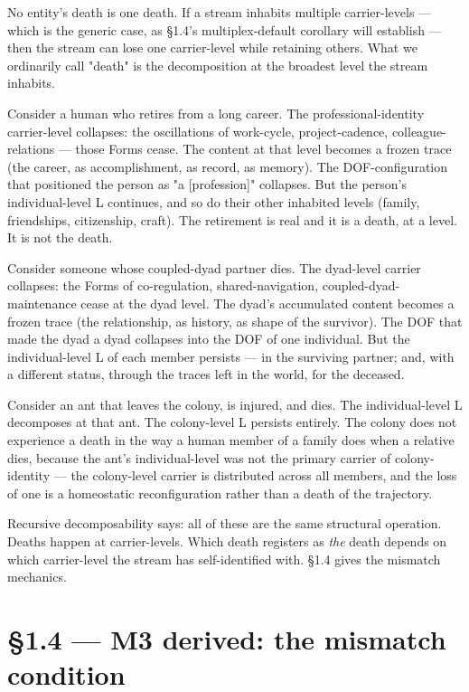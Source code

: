 \documentclass[11pt, openany]{book}
\newcommand{\sectionbreak}{\clearpage}
\begin{document}
No entity's death is one death. If a stream inhabits multiple carrier-levels --- which is the generic case, as §1.4's multiplex-default corollary will establish --- then the stream can lose one carrier-level while retaining others. What we ordinarily call "death" is the decomposition at the broadest level the stream inhabits.

Consider a human who retires from a long career. The professional-identity carrier-level collapses: the oscillations of work-cycle, project-cadence, colleague-relations --- those Forms cease. The content at that level becomes a frozen trace (the career, as accomplishment, as record, as memory). The DOF-configuration that positioned the person as "a [profession]" collapses. But the person's individual-level L continues, and so do their other inhabited levels (family, friendships, citizenship, craft). The retirement is real and it is a death, at a level. It is not the death.

Consider someone whose coupled-dyad partner dies. The dyad-level carrier collapses: the Forms of co-regulation, shared-navigation, coupled-dyad-maintenance cease at the dyad level. The dyad's accumulated content becomes a frozen trace (the relationship, as history, as shape of the survivor). The DOF that made the dyad a dyad collapses into the DOF of one individual. But the individual-level L of each member persists --- in the surviving partner; and, with a different status, through the traces left in the world, for the deceased.

Consider an ant that leaves the colony, is injured, and dies. The individual-level L decomposes at that ant. The colony-level L persists entirely. The colony does not experience a death in the way a human member of a family does when a relative dies, because the ant's individual-level was not the primary carrier of colony-identity --- the colony-level carrier is distributed across all members, and the loss of one is a homeostatic reconfiguration rather than a death of the trajectory.

Recursive decomposability says: all of these are the same structural operation. Deaths happen at carrier-levels. Which death registers as \textit{the} death depends on which carrier-level the stream has self-identified with. §1.4 gives the mismatch mechanics.

\sectionbreak

\section{§1.4 --- M3 derived: the mismatch condition}
\end{document}

